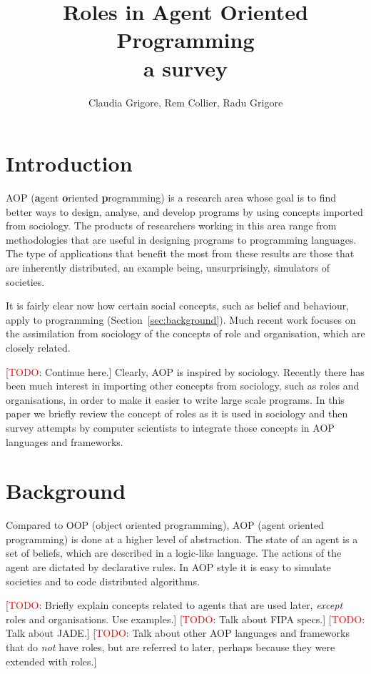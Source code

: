 \documentclass{article}
\title{Roles in Agent Oriented Programming\\\normalsize{a survey}}
\author{Claudia Grigore, Rem Collier, Radu Grigore}
\def\fb#1{\textbf{#1}}
\newcommand{\todo}[1]{[\textcolor{red}{TODO}: #1]}
\begin{document}
\maketitle

\begin{abstract}
\end{abstract}
\section{Introduction}

AOP (\fb agent \fb oriented \fb programming) is a research area
whose goal is to find better ways to design, analyse, and develop
programs by using concepts imported from sociology. The products
of researchers working in this area range from methodologies that
are useful in designing programs to programming languages. The
type of applications that benefit the most from these results
are those that are inherently distributed, an example being,
unsurprisingly, simulators of societies.

It is fairly clear now how certain social concepts,
such as belief and behaviour, apply to programming
(Section~\ref{sec:background}). Much recent work focuses on
the assimilation from sociology of the concepts of role and
organisation, which are closely related.

\todo{Continue here.}
Clearly, AOP is inspired by sociology. Recently there has been
much interest in importing other concepts from sociology, such
as roles and organisations, in order to make it easier to write
large scale programs. In this paper we briefly review the concept
of roles as it is used in sociology and then survey attempts by
computer scientists to integrate those concepts in AOP languages
and frameworks. 
\section{Background}

Compared to OOP (object oriented programming), AOP (agent oriented
programming) is done at a higher level of abstraction. The state of
an agent is a set of beliefs, which are described in a logic-like
language. The actions of the agent are dictated by declarative rules.
In AOP style it is easy to simulate societies and to code distributed
algorithms.

\todo{Briefly explain concepts related to agents that are used later,
  \emph{except} roles and organisations. Use examples.}
\todo{Talk about FIPA specs.}
\todo{Talk about JADE.}
\todo{Talk about other AOP languages and frameworks that do \emph{not}
  have roles, but are referred to later, perhaps because they were
  extended with roles.}
\end{document}
